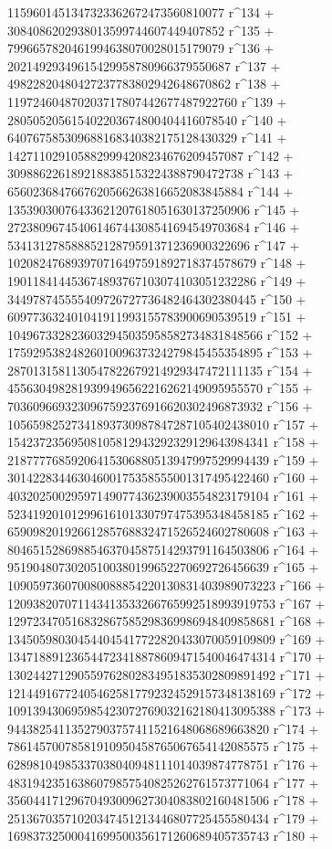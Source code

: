        1159601451347323362672473560810077 r^134 + 
       3084086202938013599744607449407852 r^135 + 
       7996657820461994638070028015179079 r^136 + 
       20214929349615429958780966379550687 r^137 + 
       49822820480427237783802942648670862 r^138 + 
       119724604870203717807442677487922760 r^139 + 
       280505205615402203674800404416078540 r^140 + 
       640767585309688168340382175128430329 r^141 + 
       1427110291058829994208234676209457087 r^142 + 
       3098862261892188385153224388790472738 r^143 + 
       6560236847667620566263816652083845884 r^144 + 
       13539030076433621207618051630137250906 r^145 + 
       27238096745406146744308541694549703684 r^146 + 
       53413127858885212879591371236900322696 r^147 + 
       102082476893970716497591892718374578679 r^148 + 
       190118414453674893767103074103051232286 r^149 + 
       344978745555409726727736482464302380445 r^150 + 
       609773632401041911993155783900690539519 r^151 + 
       1049673328236032945035958582734831848566 r^152 + 
       1759295382482601009637324279845455354895 r^153 + 
       2870131581130547822679214929347472111135 r^154 + 
       4556304982819399496562216262149095955570 r^155 + 
       7036096693230967592376916620302496873932 r^156 + 
       10565982527341893730987847287105402438010 r^157 + 
       15423723569508105812943292329129643984341 r^158 + 
       21877776859206415306880513947997529994439 r^159 + 
       30142283446304600175358555001317495422460 r^160 + 
       40320250029597149077436239003554823179104 r^161 + 
       52341920101299616101330797475395348458185 r^162 + 
       65909820192661285768832471526524602780608 r^163 + 
       80465152869885463704587514293791164503806 r^164 + 
       95190480730205100380199652270692726456639 r^165 + 
       109059736070080088854220130831403989073223 r^166 + 
       120938207071143413533266765992518993919753 r^167 + 
       129723470516832867585298369986948409858681 r^168 + 
       134505980304544045417722820433070059109809 r^169 + 
       134718891236544723418878609471540046474314 r^170 + 
       130244271290559762802834951835302809891492 r^171 + 
       121449167724054625817792324529157348138169 r^172 + 
       109139430695985423072769032162180413095388 r^173 + 
       94438254113527903757411521648068689663820 r^174 + 
       78614570078581910950458765067654142085575 r^175 + 
       62898104985337038040948111014039874778751 r^176 + 
       48319423516386079857540825262761573771064 r^177 + 
       35604417129670493009627304083802160481506 r^178 + 
       25136703571020347451213446807725455580434 r^179 + 
       16983732500041699500356171260689405735743 r^180 + 
